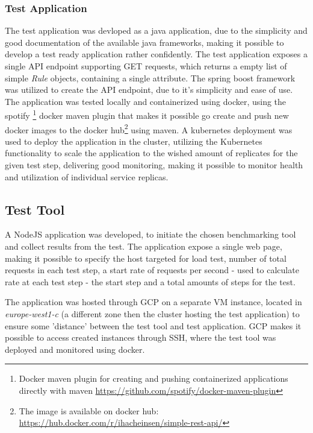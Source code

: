 \subsubsection{Test Application}
The test application was devloped as a java application, due to the simplicity and good documentation of the available java frameworks, making it possible to develop a test ready application rather confidently. The test application exposes a single API endpoint supporting GET requests, which returns a empty list of simple \textit{Rule} objects, containing a single attribute. The spring boost framework was utilized to create the API endpoint, due to it's simplicity and ease of use. The application was tested locally and containerized using docker, using the spotify \footnote{Docker maven plugin for creating and pushing containerized applications directly with maven \url{https://github.com/spotify/docker-maven-plugin}} docker maven plugin that makes it possible go create and push new docker images to the docker hub\footnote{The image is available on docker hub: \url{https://hub.docker.com/r/ihacheinsen/simple-rest-api/}} using maven. A kubernetes deployment was  used to deploy the application in the cluster, utilizing the Kubernetes functionality to scale the application to the wished amount of replicates for the given test step, delivering good monitoring, making it possible to monitor health and utilization of individual service replicas.

\subsection{Test Tool}
A NodeJS application was developed, to initiate the chosen benchmarking tool and collect results from the test. The application expose a single web page, making it possible to specify the host targeted for load test, number of total requests in each test step, a start rate of requests per second - used to calculate rate at each test step - the start step and a total amounts of steps for the test. 

The application was hosted through GCP on a separate VM instance, located in \textit{europe-west1-c} (a different zone then the cluster hosting the test application) to ensure some 'distance' between the test tool and test application. GCP makes it possible to access created instances through SSH, where the test tool was deployed and monitored using docker.

